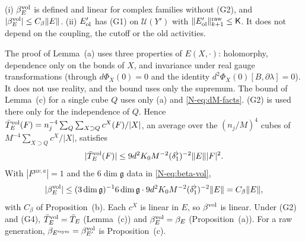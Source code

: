\begin{detail}\label{d11b:beta-vol}
(i) $\beta^{\rm vol}_E$ is defined and linear for complex families without (G2), and $|\beta^{\rm vol}_E|\le C_\beta\|E\|$. (ii) $E'_{\rm ol}$ has (G1) on $\mathcal U(Y')$ with $\|E'_{\rm ol}\|^{\rm raw}_{k+1}\le\mathsf K$. It does not depend on the coupling, the cutoff or the old activities.
\end{detail}

\begin{step}[(i)]
The proof of Lemma~(a) uses three properties of $E(X,\cdot)$: holomorphy, dependence only on the bonds of $X$, and invariance under real gauge transformations (through $d\Phi_X(0)=0$ and the identity $d^2\Phi_X(0)[B,\partial\lambda]=0$). It does not use reality, and the bound uses only the supremum. The bound of Lemma~(c) for a single cube $Q$ uses only (a) and \eqref{N-eq:dM-facts}. (G2) is used there only for the independence of $Q$. Hence $\bar T^{\rm vol}_E(F)=n_j^{-4}\sum_Q\sum_{X\supset Q}c^X(F)/|X|$, an average over the $(n_j/M)^4$ cubes of $M^{-4}\sum_{X\supset Q}c^X/|X|$, satisfies
\[
|\bar T^{\rm vol}_E(F)|\le9d^2K_0M^{-2}(\delta_1^\flat)^{-2}\|E\||F|^2 .
\]
With $|F^{\mu\nu,a}|=1$ and the $6\dim\mathfrak g$ data in \eqref{N-eq:beta-vol}, \[
|\beta^{\rm vol}_E|\le(3\dim\mathfrak g)^{-1}6\dim\mathfrak g\cdot9d^2K_0M^{-2}(\delta_1^\flat)^{-2}\|E\|=C_\beta\|E\|,
\]
with $C_\beta$ of Proposition~(b). Each $c^X$ is linear in $E$, so $\beta^{\rm vol}$ is linear. Under (G2) and (G4), $\bar T^{\rm vol}_E=\bar T_E$ (Lemma~(c)) and $\beta^{\rm vol}_E=\beta_E$ (Proposition~(a)). For a raw generation, $\beta_{E'^{\rm sym}}=\beta^{\rm vol}_{E'}$ is Proposition~(c).
\end{step}

